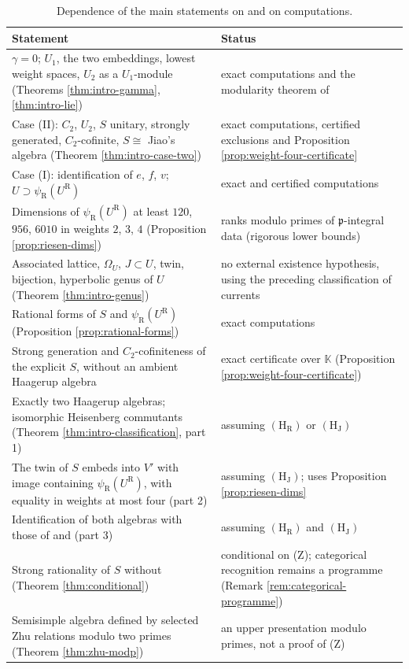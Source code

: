 \documentclass[leqno]{article}
\newcommand{\K}{\ensuremath{\mathbb{K}}}
\numberwithin{equation}{section}
\begin{document}
\begin{table}[ht]
\centering
\small
\begin{tabular}{p{7.4cm}p{6cm}}
\hline
Statement & Status \\
\hline
$\gamma = 0$; $U_1$, the two embeddings, lowest weight spaces, $U_2$ as a $U_1$-module (Theorems \ref{thm:intro-gamma}, \ref{thm:intro-lie}) & exact computations and the modularity theorem of \cite{EvG11} \\
Case (II): $C_2$, $U_2$, $S$ unitary, strongly generated, $C_2$-cofinite, $S \cong$ Jiao's algebra (Theorem \ref{thm:intro-case-two}) & exact computations, certified exclusions and Proposition \ref{prop:weight-four-certificate} \\
Case (I): identification of $e$, $f$, $v$; $U \supset \psi_{\mathrm R}(U^{\mathrm R})$ & exact and certified computations \\
Dimensions of $\psi_{\mathrm R}(U^{\mathrm R})$ at least $120$, $956$, $6010$ in weights $2$, $3$, $4$ (Proposition \ref{prop:riesen-dims}) & ranks modulo primes of $\mathfrak p$-integral data (rigorous lower bounds) \\
Associated lattice, $\Omega_U$, $J \subset U$, twin, bijection, hyperbolic genus of $U$ (Theorem \ref{thm:intro-genus}) & no external existence hypothesis, using the preceding classification of currents \\
Rational forms of $S$ and $\psi_{\mathrm R}(U^{\mathrm R})$ (Proposition \ref{prop:rational-forms}) & exact computations \\
Strong generation and $C_2$-cofiniteness of the explicit $S$, without an ambient Haagerup algebra & exact certificate over $\K$ (Proposition \ref{prop:weight-four-certificate}) \\
Exactly two Haagerup algebras; isomorphic Heisenberg commutants (Theorem \ref{thm:intro-classification}, part 1) & assuming $\mathrm{(H_R)}$ or $\mathrm{(H_J)}$ \\
The twin of $S$ embeds into $V'$ with image containing $\psi_{\mathrm R}(U^{\mathrm R})$, with equality in weights at most four (part 2) & assuming $\mathrm{(H_J)}$; uses Proposition \ref{prop:riesen-dims} \\
Identification of both algebras with those of \cite{Rie26} and \cite{Jia26} (part 3) & assuming $\mathrm{(H_R)}$ and $\mathrm{(H_J)}$ \\
Strong rationality of $S$ without \cite{Jia26} (Theorem \ref{thm:conditional}) & conditional on (Z); categorical recognition remains a programme (Remark \ref{rem:categorical-programme}) \\
Semisimple algebra defined by selected Zhu relations modulo two primes (Theorem \ref{thm:zhu-modp}) & an upper presentation modulo primes, not a proof of (Z) \\
\hline
\end{tabular}
\caption{Dependence of the main statements on \cite{Jia26,Rie26} and on computations.}
\label{tab:dependencies}
\end{table}
\end{document}

